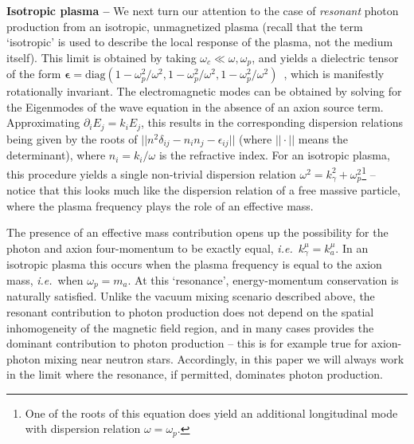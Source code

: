\documentclass[twocolumn,superscriptaddress,floatfix,preprintnumbers,prd,nofootinbib,aps,10pt]{revtex4-2}
\renewcommand\({\left(}
\renewcommand\){\right)}
\renewcommand\[{\left[}
\renewcommand\]{\right]}
\newcommand\ie{{\it i.e.}~}
\begin{document}
{\bf Isotropic plasma -- }We next turn our attention to the case of \textit{resonant} photon production from an isotropic, unmagnetized plasma (recall that the term `isotropic' is used to describe the local response of the plasma, not the medium itself). This limit is obtained by taking $\omega_c \ll \omega, \omega_p$, and yields a dielectric tensor of the form $\boldsymbol\epsilon = \textrm{diag}(1 - \omega_p^2 / \omega^2, 1 - \omega_p^2 / \omega^2, 1 - \omega_p^2 / \omega^2)$~\cite{swanson2003plasma}, which is manifestly rotationally invariant. The electromagnetic modes can be obtained by solving for the Eigenmodes of the wave equation in the absence of an axion source term. Approximating $\partial_i E_j = k_i E_j$, this results in the corresponding dispersion relations being given by the roots of $|| n^2 \delta_{ij} - n_i n_j - \epsilon_{ij}||$ (where $|| \cdot ||$ means the determinant), where $n_i = k_i / \omega$ is the refractive index. For an isotropic plasma, this procedure yields a single non-trivial dispersion relation $\omega^2 = k_\gamma^2 + \omega_p^2$\footnote{One of the roots of this equation does yield an additional longitudinal mode with dispersion relation $\omega = \omega_p$.} -- notice that this looks much like the dispersion relation of a free massive particle, where the plasma frequency plays the role of an effective mass.

The presence of an effective mass contribution opens up the possibility for the photon and axion four-momentum to be exactly equal, \ie $k^\mu_\gamma = k^\mu_a$. In an isotropic plasma this occurs when the plasma frequency is equal to the axion mass, \ie when $\omega_p = m_a$. At this `resonance', energy-momentum conservation is naturally satisfied. Unlike the vacuum mixing scenario described above, the resonant contribution to photon production does not depend on the spatial inhomogeneity of the magnetic field region, and in many cases provides the dominant contribution to photon production -- this is for example true for axion-photon mixing near neutron stars. Accordingly, in this paper we will always work in the limit where the resonance, if permitted, dominates photon production.
\end{document}
